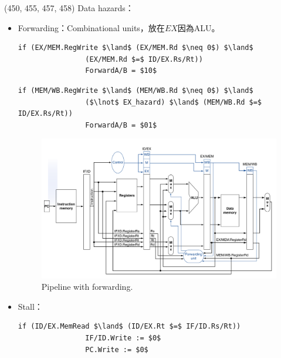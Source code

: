 \item \begin{theorem}{(450, 455, 457, 458)} Data hazards：\begin{itemize}
        \item Forwarding：Combinational units，放在$EX$因為ALU。
        \begin{lstlisting}[caption={EX hazard.}, captionpos=b, mathescape=true, language={[x86masm]Assembler}]
            if (EX/MEM.RegWrite $\land$ (EX/MEM.Rd $\neq 0$) $\land$ 
                (EX/MEM.Rd $=$ ID/EX.Rs/Rt))
                ForwardA/B = $10$
        \end{lstlisting}
        \begin{lstlisting}[caption={MEM hazard.}, captionpos=b, mathescape=true, language={[x86masm]Assembler}]
            if (MEM/WB.RegWrite $\land$ (MEM/WB.Rd $\neq 0$) $\land$ 
                ($\lnot$ EX_hazard) $\land$ (MEM/WB.Rd $=$ ID/EX.Rs/Rt))
                ForwardA/B = $01$
        \end{lstlisting}
        \begin{figure}[H]
            \centering
            \includegraphics[scale=0.3]{img/pipeline-forward.png}
            \caption{Pipeline with forwarding.}
            \label{img:pipeline-forward}
        \end{figure}
        \item Stall：\code{}
        \begin{lstlisting}[caption={Stall.}, captionpos=b, mathescape=true, language={[x86masm]Assembler}]
            if (ID/EX.MemRead $\land$ (ID/EX.Rt $=$ IF/ID.Rs/Rt))
                IF/ID.Write := $0$
                PC.Write := $0$
        \end{lstlisting}
        \begin{figure}[H]
            \centering

\end{figure}
\end{itemize}
\end{theorem}
